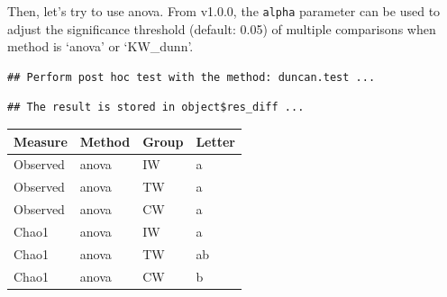 \documentclass[
]{book}
\newenvironment{Shaded}{\begin{snugshade}}{\end{snugshade}}
\newcommand{\AttributeTok}[1]{\textcolor[rgb]{0.13,0.29,0.53}{#1}}
\newcommand{\CommentTok}[1]{\textcolor[rgb]{0.56,0.35,0.01}{\textit{#1}}}
\newcommand{\FunctionTok}[1]{\textcolor[rgb]{0.13,0.29,0.53}{\textbf{#1}}}
\newcommand{\NormalTok}[1]{#1}
\newcommand{\SpecialCharTok}[1]{\textcolor[rgb]{0.81,0.36,0.00}{\textbf{#1}}}
\newcommand{\StringTok}[1]{\textcolor[rgb]{0.31,0.60,0.02}{#1}}
\newcounter{none} %
\begin{document}
Then, let's try to use anova.
From v1.0.0, the \texttt{alpha} parameter can be used to adjust the significance threshold (default: 0.05) of multiple comparisons when method is `anova' or `KW\_dunn'.

\begin{Shaded}
\end{Shaded}

\begin{verbatim}
## Perform post hoc test with the method: duncan.test ...
\end{verbatim}

\begin{verbatim}
## The result is stored in object$res_diff ...
\end{verbatim}

{\def\LTcaptype{none} %
\begin{longtable}[]{@{}
  >{\centering\arraybackslash}p{}
  >{\centering\arraybackslash}p{}
  >{\centering\arraybackslash}p{}
  >{\centering\arraybackslash}p{}@{}}
\toprule\noalign{}
\begin{minipage}[b]{\linewidth}\centering
Measure
\end{minipage} & \begin{minipage}[b]{\linewidth}\centering
Method
\end{minipage} & \begin{minipage}[b]{\linewidth}\centering
Group
\end{minipage} & \begin{minipage}[b]{\linewidth}\centering
Letter
\end{minipage} \\
\midrule\noalign{}
\endhead
\bottomrule\noalign{}
\endlastfoot
Observed & anova & IW & a \\
Observed & anova & TW & a \\
Observed & anova & CW & a \\
Chao1 & anova & IW & a \\
Chao1 & anova & TW & ab \\
Chao1 & anova & CW & b \\
\end{longtable}
}
\end{document}
